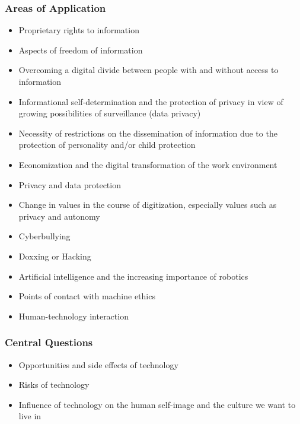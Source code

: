 \documentclass[11pt]{article}
\theoremstyle{definition}
\begin{document}
\subsubsection{Areas of Application}
\begin{itemize}
	\item Proprietary rights to information
	\item Aspects of freedom of information
	\item Overcoming a digital divide between people with and without access to information
	\item Informational self-determination and the protection of privacy in view of growing possibilities of surveillance (data privacy)
	\item Necessity of restrictions on the dissemination of information due to the protection of personality and/or child protection
	\item Economization and the digital transformation of the work environment
	\item Privacy and data protection
	\item Change in values in the course of digitization, especially values such as privacy and autonomy
	\item Cyberbullying
	\item Doxxing or Hacking
	\item Artificial intelligence and the increasing importance of robotics
	\item Points of contact with machine ethics
	\item Human-technology interaction
\end{itemize}

\subsubsection{Central Questions}
\begin{itemize}
	\item Opportunities and side effects of technology
	\item Risks of technology
	\item Influence of technology on the human self-image and the culture we want to live in
\end{itemize}
\end{document}
